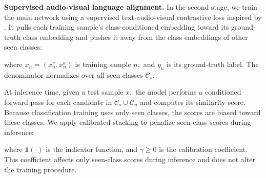 \textbf{Supervised audio-visual language alignment. }In the second stage, we train the main network using a supervised text-audio-visual contrastive loss inspired by \cite{mo2024easy}. It pulls each training sample\textquoteright{}s class-conditioned embedding toward its ground-truth class embedding and pushes it away from the class embeddings of other seen classes:


\noindent\unskip where ${x}_{n}=({x}_{n}^{v},{x}_{n}^{a})$ is training sample $n,$ and ${y}_{n}$ is its ground-truth label. The denominator normalizes over all seen classes ${\mathcal{C}}_{s}.$

At inference time, given a test sample $x,$ the model performs a conditioned forward pass for each candidate in ${\mathcal{C}}_{s}\cup {\mathcal{C}}_{u}$ and computes its similarity score. Because classification training uses only seen classes, the scores are biased toward these classes. We apply calibrated stacking \cite{chao2016gzsl} to penalize seen-class scores during inference:


\noindent\unskip where $\mathbb{1}(\cdot )$ is the indicator function, and $\gamma \ge 0$ is the calibration coefficient. This coefficient affects only seen-class scores during inference and does not alter the training procedure.
